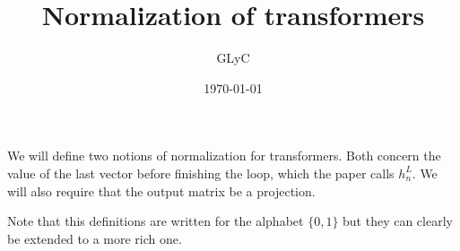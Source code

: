 \documentclass{article}
\title{Normalization of transformers}
\author{GLyC}
\date{\today}
\begin{document}
\maketitle

We will define two notions of normalization for transformers. Both concern the value of the last vector before finishing the loop, which the paper calls $h_n^L$. We will also require that the output matrix be a projection.

Note that this definitions are written for the alphabet $\{0,1\}$ but they can clearly be extended to a more rich one.




\end{document}
